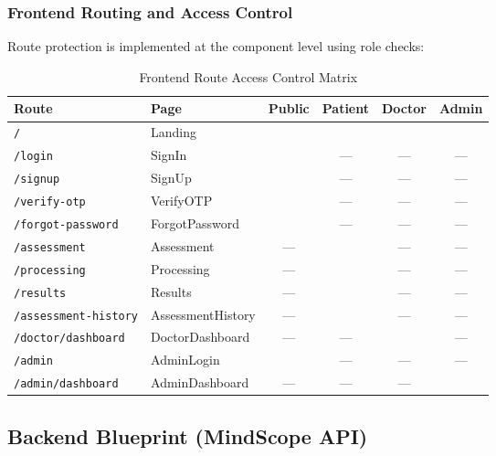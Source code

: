 \documentclass[12pt]{article}
\begin{document}
	\subsubsection{Frontend Routing and Access Control}

	Route protection is implemented at the component level using role checks:

	\begin{table}[H]
		\centering
		\caption{Frontend Route Access Control Matrix}
		\small
		\begin{tabular}{|l|l|c|c|c|c|}
			\hline
			\textbf{Route} & \textbf{Page} & \textbf{Public} & \textbf{Patient} & \textbf{Doctor} & \textbf{Admin} \\ \hline
			\texttt{/} & Landing & \checkmark & \checkmark & \checkmark & \checkmark \\ \hline
			\texttt{/login} & SignIn & \checkmark & --- & --- & --- \\ \hline
			\texttt{/signup} & SignUp & \checkmark & --- & --- & --- \\ \hline
			\texttt{/verify-otp} & VerifyOTP & \checkmark & --- & --- & --- \\ \hline
			\texttt{/forgot-password} & ForgotPassword & \checkmark & --- & --- & --- \\ \hline
			\texttt{/assessment} & Assessment & --- & \checkmark & --- & --- \\ \hline
			\texttt{/processing} & Processing & --- & \checkmark & --- & --- \\ \hline
			\texttt{/results} & Results & --- & \checkmark & --- & --- \\ \hline
			\texttt{/assessment-history} & AssessmentHistory & --- & \checkmark & --- & --- \\ \hline
			\texttt{/doctor/dashboard} & DoctorDashboard & --- & --- & \checkmark & --- \\ \hline
			\texttt{/admin} & AdminLogin & \checkmark & --- & --- & --- \\ \hline
			\texttt{/admin/dashboard} & AdminDashboard & --- & --- & --- & \checkmark \\ \hline
		\end{tabular}
	\end{table}


	\subsection{Backend Blueprint (MindScope API)}
\end{document}
